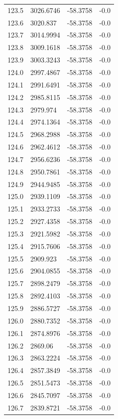 \begin{table}[H]
\begin{tabular}{llll}
123.5 & 3026.6746 & -58.3758 & -0.0 \\
123.6 & 3020.837 & -58.3758 & -0.0 \\
123.7 & 3014.9994 & -58.3758 & -0.0 \\
123.8 & 3009.1618 & -58.3758 & -0.0 \\
123.9 & 3003.3243 & -58.3758 & -0.0 \\
124.0 & 2997.4867 & -58.3758 & -0.0 \\
124.1 & 2991.6491 & -58.3758 & -0.0 \\
124.2 & 2985.8115 & -58.3758 & -0.0 \\
124.3 & 2979.974 & -58.3758 & -0.0 \\
124.4 & 2974.1364 & -58.3758 & -0.0 \\
124.5 & 2968.2988 & -58.3758 & -0.0 \\
124.6 & 2962.4612 & -58.3758 & -0.0 \\
124.7 & 2956.6236 & -58.3758 & -0.0 \\
124.8 & 2950.7861 & -58.3758 & -0.0 \\
124.9 & 2944.9485 & -58.3758 & -0.0 \\
125.0 & 2939.1109 & -58.3758 & -0.0 \\
125.1 & 2933.2733 & -58.3758 & -0.0 \\
125.2 & 2927.4358 & -58.3758 & -0.0 \\
125.3 & 2921.5982 & -58.3758 & -0.0 \\
125.4 & 2915.7606 & -58.3758 & -0.0 \\
125.5 & 2909.923 & -58.3758 & -0.0 \\
125.6 & 2904.0855 & -58.3758 & -0.0 \\
125.7 & 2898.2479 & -58.3758 & -0.0 \\
125.8 & 2892.4103 & -58.3758 & -0.0 \\
125.9 & 2886.5727 & -58.3758 & -0.0 \\
126.0 & 2880.7352 & -58.3758 & -0.0 \\
126.1 & 2874.8976 & -58.3758 & -0.0 \\
126.2 & 2869.06 & -58.3758 & -0.0 \\
126.3 & 2863.2224 & -58.3758 & -0.0 \\
126.4 & 2857.3849 & -58.3758 & -0.0 \\
126.5 & 2851.5473 & -58.3758 & -0.0 \\
126.6 & 2845.7097 & -58.3758 & -0.0 \\
126.7 & 2839.8721 & -58.3758 & -0.0 \\

\end{tabular}
\end{table}
